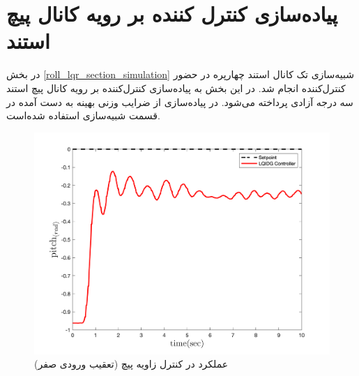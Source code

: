 \section{پیاده‌سازی کنترل کننده  بر رویه کانال پیچ استند}\label{roll_lqr_section}
در بخش
\ref{roll_lqr_section_simulation}
شبیه‌سازی تک کانال استند چهارپره در حضور کنترل‌کننده  انجام شد. در این بخش به پیاده‌سازی کنترل‌کننده  بر رویه کانال پیچ استند سه درجه آزادی پرداخته می‌شود. در پیاده‌سازی از ضرایب وزنی بهینه به دست آمده در قسمت شبیه‌سازی استفاده شده‌است.
\begin{figure}[H]
	\includegraphics[width=.48\linewidth]{../Figures/Calibration/LQR/Pitch/lqr_pitch.png}
	\centering
	\caption{عملكرد  در کنترل زاويه پیچ (تعقیب ورودی صفر)}
\end{figure}
%
